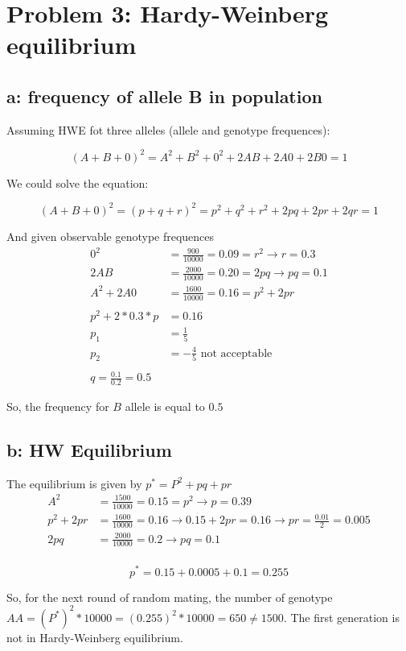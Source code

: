 \setcounter{chapter}{3}
\setcounter{section}{0}
\section{Problem 3: Hardy-Weinberg equilibrium}
\subsection{a: frequency of allele B in population}
Assuming HWE fot three alleles (allele and genotype frequences):

\[  (A+B+0)^2 = A^2 + B^2 + 0^2 + 2AB + 2A0 + 2B0 = 1  \]

We could solve the equation: 

\[  (A+B+0)^2 = (p+q+r)^2 = p^2 + q^2 + r^2 + 2pq + 2pr + 2qr = 1  \]

And given observable genotype frequences
\begin{align}
0^2 &= \frac{900}{10000} = 0.09 = r^2 \rightarrow r = 0.3 \\
2AB &= \frac{2000}{10000} = 0.20 = 2pq \rightarrow pq = 0.1 \\
A^2 + 2A0 &= \frac{1600}{10000} = 0.16 = p^2 + 2pr\\
\\
p^2+2*0.3*p &= 0.16 \\
p_1 &= \frac{1}{5} \\
p_2 &= -\frac{4}{5} \text{~not acceptable}\\
\\
q = \frac{0.1}{0.2} = 0.5
\end{align}

So, the frequency for $B$ allele is equal to $0.5$

\subsection{b: HW Equilibrium}
The equilibrium is given by $p^* = P^2+pq+pr$
\begin{align}
A^2 &= \frac{1500}{10000} = 0.15 = p^2 \rightarrow p = 0.39 \\
p^2+2pr &= \frac{1600}{10000} = 0.16 \rightarrow 0.15+2pr = 0.16 \rightarrow pr = \frac{0.01}{2} = 0.005\\
2pq &= \frac{2000}{10000} = 0.2 \rightarrow pq = 0.1\\
\end{align}

\[ p^* = 0.15+0.0005 + 0.1 = 0.255 \]

So, for the next round of random mating, the number of genotype $AA = (P^*)^2 * 10000 = (0.255)^2*10000 = 650 \neq 1500$.
The first generation is not in Hardy-Weinberg equilibrium.

